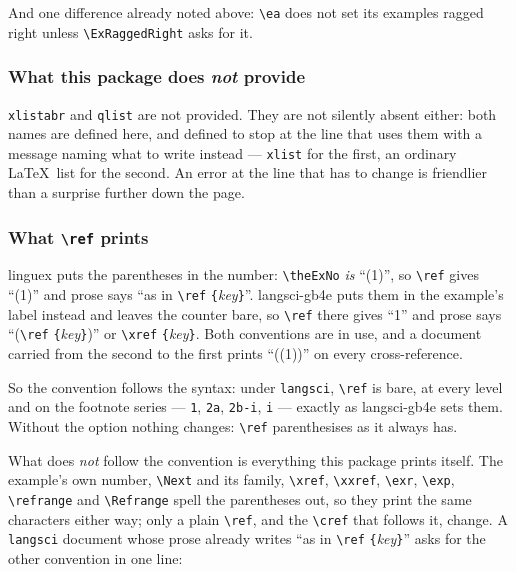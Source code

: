 \documentclass[11pt,a4paper]{article}
\newcommand{\cs}[1]{\texttt{\textbackslash #1}}
\newcommand{\pkg}[2][]{\textsf{#2}}
\newcommand{\opt}[1]{\texttt{#1}}
\newcommand{\meta}[1]{\textrm{\itshape\textlangle#1\textrangle}}
\newcommand{\marg}[1]{\penalty300 \texttt{\{}\meta{#1}\texttt{\}}}
\begin{document}
\noindent And one difference already noted above: \cs{ea} does not set its
examples ragged right unless \cs{ExRaggedRight} asks for it.

\subsubsection*{What this package does \emph{not} provide}

\texttt{xlistabr} and \texttt{qlist} are not provided. They are not silently
absent either: both names are defined here, and defined to stop at the line
that uses them with a message naming what to write instead ---
\texttt{xlist} for the first, an ordinary \LaTeX\ list for the second. An
error at the line that has to change is friendlier than a surprise further
down the page.

\subsubsection*{What \cs{ref} prints}\label{sec:langsciref}

\pkg{linguex} puts the parentheses in the number: \cs{theExNo} \emph{is}
``(1)'', so \cs{ref} gives ``(1)'' and prose says ``as in \cs{ref}\marg{key}''.
\pkg{langsci-gb4e} puts them in the example's label instead and leaves the
counter bare, so \cs{ref} there gives ``1'' and prose says
``(\cs{ref}\marg{key})'' or \cs{xref}\marg{key}. Both conventions are in
use, and a document carried from the second to the first prints ``((1))'' on
every cross-reference.

So the convention follows the syntax: under \opt{langsci}, \cs{ref} is bare,
at every level and on the footnote series --- \texttt{1}, \texttt{2a},
\texttt{2b-i}, \texttt{i} --- exactly as \pkg{langsci-gb4e} sets them.
Without the option nothing changes: \cs{ref} parenthesises as it always has.

What does \emph{not} follow the convention is everything this package prints
itself. The example's own number, \cs{Next} and its family, \cs{xref},
\cs{xxref}, \cs{exr}, \cs{exp}, \cs{refrange} and \cs{Refrange} spell the
parentheses out, so they print the same characters either way; only a plain
\cs{ref}, and the \cs{cref} that follows it, change. A \opt{langsci}
document whose prose already writes ``as in \cs{ref}\marg{key}'' asks for the
other convention in one line:

\begin{code}
\ExParenRefs   %
\ExBareRefs    %
\end{code}
\end{document}
